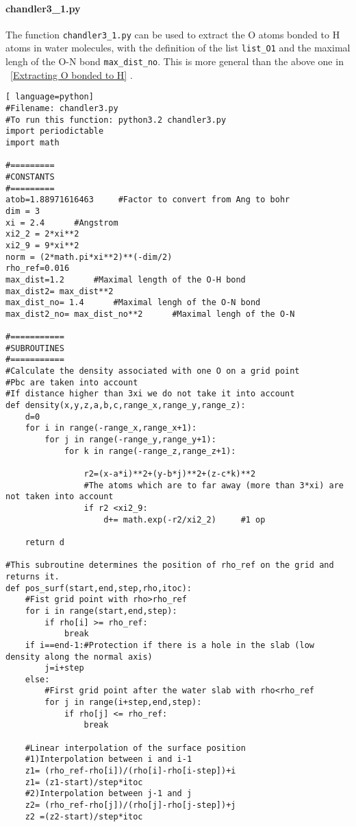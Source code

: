 \paragraph{chandler3\_1.py}     \label{chandler3_1}
The function \texttt{chandler3\_1.py} can be used to extract the O atoms bonded to H atoms in water molecules, with the definition of the list \texttt{list\_O1} and 
the maximal lengh of the O-N bond \texttt{max\_dist\_no}. This is more general than the above one in ~\ref{Extracting O bonded to H} .
\begin{lstlisting}[ language=python]
#Filename: chandler3.py 
#To run this function: python3.2 chandler3.py
import periodictable
import math 

#=========
#CONSTANTS
#=========
atob=1.88971616463     #Factor to convert from Ang to bohr
dim = 3
xi = 2.4      #Angstrom
xi2_2 = 2*xi**2
xi2_9 = 9*xi**2
norm = (2*math.pi*xi**2)**(-dim/2)
rho_ref=0.016
max_dist=1.2      #Maximal length of the O-H bond
max_dist2= max_dist**2
max_dist_no= 1.4      #Maximal lengh of the O-N bond
max_dist2_no= max_dist_no**2      #Maximal lengh of the O-N 

#===========
#SUBROUTINES
#===========
#Calculate the density associated with one O on a grid point
#Pbc are taken into account
#If distance higher than 3xi we do not take it into account
def density(x,y,z,a,b,c,range_x,range_y,range_z): 
	d=0
	for i in range(-range_x,range_x+1): 
		for j in range(-range_y,range_y+1): 
			for k in range(-range_z,range_z+1):

				r2=(x-a*i)**2+(y-b*j)**2+(z-c*k)**2 
				#The atoms which are to far away (more than 3*xi) are not taken into account
				if r2 <xi2_9:
					d+= math.exp(-r2/xi2_2)     #1 op

	return d 

#This subroutine determines the position of rho_ref on the grid and returns it. 
def pos_surf(start,end,step,rho,itoc):
	#Fist grid point with rho>rho_ref
	for i in range(start,end,step):
		if rho[i] >= rho_ref:
			break
	if i==end-1:#Protection if there is a hole in the slab (low density along the normal axis)
		j=i+step
	else:
		#First grid point after the water slab with rho<rho_ref
		for j in range(i+step,end,step):
			if rho[j] <= rho_ref:
				break

	#Linear interpolation of the surface position 
	#1)Interpolation between i and i-1
	z1= (rho_ref-rho[i])/(rho[i]-rho[i-step])+i
	z1= (z1-start)/step*itoc
	#2)Interpolation between j-1 and j
	z2= (rho_ref-rho[j])/(rho[j]-rho[j-step])+j
	z2 =(z2-start)/step*itoc
	

\end{lstlisting}
